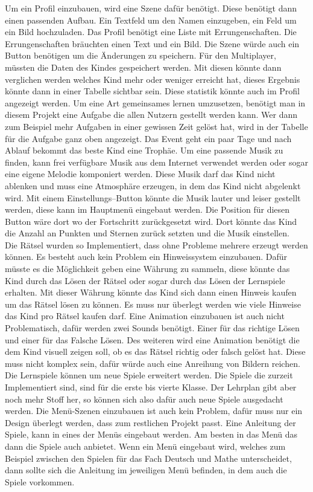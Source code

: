 Um ein Profil einzubauen, wird eine Szene dafür benötigt. Diese benötigt dann einen passenden Aufbau. Ein Textfeld um den Namen einzugeben, ein Feld um ein Bild hochzuladen. Das Profil benötigt eine Liste mit Errungenschaften. Die Errungenschaften bräuchten einen Text und ein Bild. Die Szene würde auch ein Button benötigen um die Änderungen zu speichern. Für den Multiplayer, müssten die Daten des Kindes gespeichert werden. Mit diesen könnte dann verglichen werden welches Kind mehr oder weniger erreicht hat, dieses Ergebnis könnte dann in einer Tabelle sichtbar sein. Diese statistik könnte auch im Profil angezeigt werden. Um eine Art gemeinsames lernen umzusetzen, benötigt man in diesem Projekt eine Aufgabe die allen Nutzern gestellt werden kann. Wer dann zum Beispiel mehr Aufgaben in einer gewissen Zeit gelöst hat, wird in der Tabelle für die Aufgabe ganz oben angezeigt. Das Event geht ein paar Tage und nach Ablauf bekommt das beste Kind eine Trophäe. Um eine passende Musik zu finden, kann frei verfügbare Musik aus dem Internet verwendet werden oder sogar eine eigene Melodie komponiert werden. Diese Musik darf das Kind nicht ablenken und muss eine Atmosphäre erzeugen, in dem das Kind nicht abgelenkt wird. Mit einem Einstellungs--Button könnte die Musik lauter und leiser gestellt werden, diese kann im Hauptmenü eingebaut werden. Die Position für diesen Button wäre dort wo der Fortschritt zurückgesetzt wird. Dort könnte das Kind die Anzahl an Punkten und Sternen zurück setzten und die Musik einstellen.\\
Die Rätsel wurden so Implementiert, dass ohne Probleme mehrere erzeugt werden können. Es besteht auch kein Problem ein Hinweissystem einzubauen. Dafür müsste es die Möglichkeit geben eine Währung zu sammeln, diese könnte das Kind durch das Lösen der Rätsel oder sogar durch das Lösen der Lernspiele erhalten. Mit dieser Währung könnte das Kind sich dann einen Hinweis kaufen um das Rätsel lösen zu können. Es muss nur überlegt werden wie viele Hinweise das Kind pro Rätsel kaufen darf. Eine Animation einzubauen ist auch nicht Problematisch, dafür werden zwei Sounds benötigt. Einer für das richtige Lösen und einer für das Falsche Lösen. Des weiteren wird eine Animation benötigt die dem Kind visuell zeigen soll, ob es das Rätsel richtig oder falsch gelöst hat. Diese muss nicht komplex sein, dafür würde auch eine Anreihung von Bildern reichen. \\
Die Lernspiele können um neue Spiele erweitert werden. Die Spiele die zurzeit Implementiert sind, sind für die erste bis vierte Klasse. Der Lehrplan gibt aber noch mehr Stoff her, so können sich also dafür auch neue Spiele ausgedacht werden. Die Menü-Szenen einzubauen ist auch kein Problem, dafür muss nur ein Design überlegt werden, dass zum restlichen Projekt passt. Eine Anleitung der Spiele, kann in eines der Menüs eingebaut werden. Am besten in das Menü das dann die Spiele auch anbietet. Wenn ein Menü eingebaut wird, welches zum Beispiel zwischen den Spielen für das Fach Deutsch und Mathe unterscheidet, dann sollte sich die Anleitung im jeweiligen Menü befinden, in dem auch die Spiele vorkommen.\\

\appendix

\printbibliography[heading=bibintoc]



